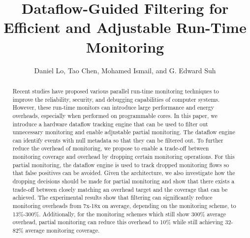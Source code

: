 \title{
Dataflow-Guided Filtering for Efficient and Adjustable Run-Time Monitoring
}

{\author{Daniel Lo, Tao Chen, Mohamed Ismail, and G. Edward Suh}}

\date{}
\maketitle

\thispagestyle{empty}

\begin{abstract}

Recent studies have proposed various parallel run-time monitoring techniques to
improve the reliability, security, and debugging capabilities of computer
systems. However, these run-time monitors can introduce large performance and energy
overheads, especially when performed on programmable cores.
In this paper, we introduce a hardware dataflow tracking engine that can be
used to filter out unnecessary monitoring and enable adjustable partial monitoring.
The dataflow engine can identify events with null metadata so that they can
be filtered out. To further reduce the overhead of monitoring, we propose
to enable a trade-off between monitoring coverage and overhead by dropping certain
monitoring operations. For this partial monitoring, the dataflow engine is used
to track dropped monitoring flows so that false positives can be avoided.
Given the architecture, we also investigate how the dropping decisions should be
made for partial monitoring and show that there exists a trade-off between closely
matching an overhead target and the coverage that can be achieved.
The experimental results show that filtering can significantly reduce monitoring
overheads from 7x-18x on average, depending on the monitoring scheme, to
13\%-300\%. Additionally, for the monitoring schemes which still show 300\%
average overhead, partial monitoring can reduce this overhead to 10\% while
still achieving 32-82\% average monitoring coverage. 

\end{abstract}
